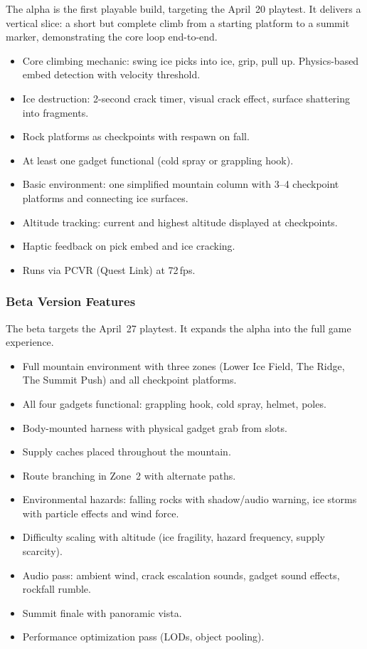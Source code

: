 \documentclass[12pt]{article}
\begin{document}
The alpha is the first playable build, targeting the April~20 playtest. It delivers a vertical slice: a short but complete climb from a starting platform to a summit marker, demonstrating the core loop end-to-end.

\begin{itemize}[leftmargin=2em]
    \item Core climbing mechanic: swing ice picks into ice, grip, pull up. Physics-based embed detection with velocity threshold.
    \item Ice destruction: 2-second crack timer, visual crack effect, surface shattering into fragments.
    \item Rock platforms as checkpoints with respawn on fall.
    \item At least one gadget functional (cold spray or grappling hook).
    \item Basic environment: one simplified mountain column with 3--4 checkpoint platforms and connecting ice surfaces.
    \item Altitude tracking: current and highest altitude displayed at checkpoints.
    \item Haptic feedback on pick embed and ice cracking.
    \item Runs via PCVR (Quest Link) at 72\,fps.
\end{itemize}

\subsubsection{Beta Version Features}

The beta targets the April~27 playtest. It expands the alpha into the full game experience.

\begin{itemize}[leftmargin=2em]
    \item Full mountain environment with three zones (Lower Ice Field, The Ridge, The Summit Push) and all checkpoint platforms.
    \item All four gadgets functional: grappling hook, cold spray, helmet, poles.
    \item Body-mounted harness with physical gadget grab from slots.
    \item Supply caches placed throughout the mountain.
    \item Route branching in Zone~2 with alternate paths.
    \item Environmental hazards: falling rocks with shadow/audio warning, ice storms with particle effects and wind force.
    \item Difficulty scaling with altitude (ice fragility, hazard frequency, supply scarcity).
    \item Audio pass: ambient wind, crack escalation sounds, gadget sound effects, rockfall rumble.
    \item Summit finale with panoramic vista.
    \item Performance optimization pass (LODs, object pooling).
\end{itemize}
\end{document}
